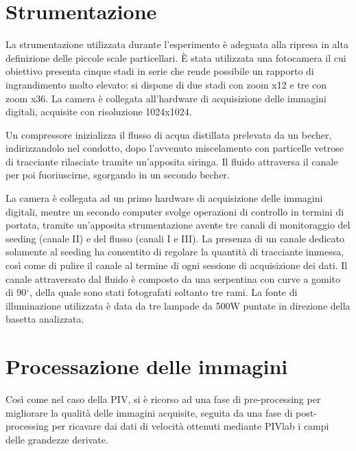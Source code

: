 \documentclass{article} %
\begin{document}
\section{Strumentazione}
La strumentazione utilizzata durante l'esperimento è adeguata alla ripresa in alta definizione delle piccole scale particellari. È stata utilizzata una fotocamera il cui obiettivo presenta cinque stadi in serie che rende possibile un rapporto di ingrandimento molto elevato: si dispone di due stadi con zoom x12 e tre con zoom x36. La camera è collegata all'hardware di acquisizione delle immagini digitali, acquisite con risoluzione 1024x1024.\par
Un compressore inizializza il flusso di acqua distillata prelevata da un becher, indirizzandolo nel condotto, dopo l'avvenuto miscelamento con particelle vetrose di tracciante rilasciate tramite un'apposita siringa.
Il fluido attraversa il canale per poi fuoriuscirne, sgorgando in un secondo becher.\par
La camera è collegata ad un primo hardware di acquisizione delle immagini digitali, mentre un secondo computer svolge operazioni di controllo in termini di portata, tramite un'apposita strumentazione avente tre canali di monitoraggio del seeding (canale II) e del flusso (canali I e III). La presenza di un canale dedicato solamente al seeding ha consentito di regolare la quantità di tracciante immessa, così come di pulire il canale al termine di ogni sessione di acquisizione dei dati.
Il canale attraversato dal fluido è composto da una serpentina con curve a gomito di 90$^\circ$, della quale sono stati fotografati soltanto tre rami. La fonte di illuminazione utilizzata è data da tre lampade da 500W puntate in direzione della basetta analizzata.\par
\section{Processazione delle immagini}
Così come nel caso della PIV, si è ricorso ad una fase di pre-processing per migliorare la qualità delle immagini acquisite, seguita da una fase di post-processing per ricavare dai dati di velocità ottenuti mediante PIVlab i campi delle grandezze derivate.
\end{document}
